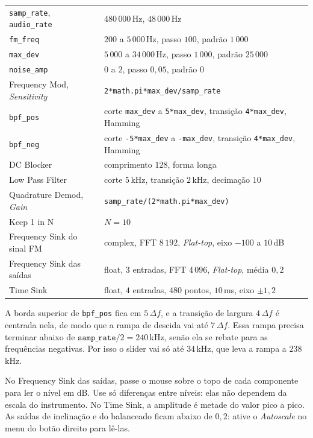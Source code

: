 \documentclass[11pt,a4paper]{article}
\begin{document}
\begin{center}\small
\begin{tabular}{l l}
  \toprule
  \texttt{samp\_rate}, \texttt{audio\_rate} & $480\,000$\,Hz, $48\,000$\,Hz \\
  \texttt{fm\_freq} & $200$ a $5\,000$\,Hz, passo $100$, padrão $1\,000$ \\
  \texttt{max\_dev} & $5\,000$ a $34\,000$\,Hz, passo $1\,000$, padrão $25\,000$ \\
  \texttt{noise\_amp} & $0$ a $2$, passo $0{,}05$, padrão $0$ \\
  Frequency Mod, \textit{Sensitivity} & \texttt{2*math.pi*max\_dev/samp\_rate} \\
  \texttt{bpf\_pos} & corte \texttt{max\_dev} a \texttt{5*max\_dev}, transição \texttt{4*max\_dev}, Hamming \\
  \texttt{bpf\_neg} & corte \texttt{-5*max\_dev} a \texttt{-max\_dev}, transição \texttt{4*max\_dev}, Hamming \\
  DC Blocker & comprimento $128$, forma longa \\
  Low Pass Filter & corte $5$\,kHz, transição $2$\,kHz, decimação $10$ \\
  Quadrature Demod, \textit{Gain} & \texttt{samp\_rate/(2*math.pi*max\_dev)} \\
  Keep 1 in N & $N = 10$ \\
  Frequency Sink do sinal FM & complex, FFT $8\,192$, \textit{Flat-top}, eixo $-100$ a $10$\,dB \\
  Frequency Sink das saídas & float, $3$ entradas, FFT $4\,096$, \textit{Flat-top}, média $0{,}2$ \\
  Time Sink & float, $4$ entradas, $480$ pontos, $10$\,ms, eixo $\pm 1{,}2$ \\
  \bottomrule
\end{tabular}
\end{center}

\begin{atencao}
A borda superior de \texttt{bpf\_pos} fica em $5\,\Delta f$, e a transição de
largura $4\,\Delta f$ é centrada nela, de modo que a rampa de descida vai até
$7\,\Delta f$. Essa rampa precisa terminar abaixo de
$\texttt{samp\_rate}/2 = 240$\,kHz, senão ela se rebate para as frequências
negativas. Por isso o slider vai só até $34$\,kHz, que leva a rampa a
$238$\,kHz.
\end{atencao}

\begin{instrucao}
No Frequency Sink das saídas, passe o mouse sobre o topo de cada componente para
ler o nível em dB. Use só diferenças entre níveis: elas não dependem da escala
do instrumento. No Time Sink, a amplitude é metade do valor pico a pico. As saídas de
inclinação e do balanceado ficam abaixo de $0{,}2$: ative o \textit{Autoscale}
no menu do botão direito para lê-las.
\end{instrucao}
\end{document}
